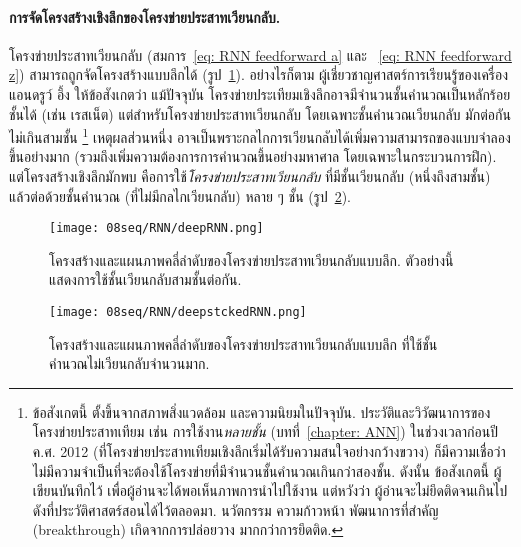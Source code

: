 \paragraph{การจัดโครงสร้างเชิงลึกของโครงข่ายประสาทเวียนกลับ.}
โครงข่ายประสาทเวียนกลับ (สมการ~\ref{eq: RNN feedforward a} และ ~\ref{eq: RNN feedforward z})
สามารถถูกจัดโครงสร้างแบบลึกได้ (รูป~\ref{fig: deep RNN}).
อย่างไรก็ตาม
ผู้เชี่ยวชาญศาสตร์การเรียนรู้ของเครื่อง
แอนดรูว์ อึ้ง\cite{Ng2020a} ให้ข้อสังเกตว่า
แม้ปัจจุบัน โครงข่ายประเทียมเชิงลึกอาจมีจำนวนชั้นคำนวณเป็นหลักร้อยชั้นได้ (เช่น เรสเน็ต\cite{He_2016_CVPR})
แต่สำหรับโครงข่ายประสาทเวียนกลับ โดยเฉพาะชั้นคำนวณเวียนกลับ มักต่อกันไม่เกินสามชั้น%
\footnote{%
	ข้อสังเกตนี้ ตั้งขึ้นจากสภาพสิ่งแวดล้อม และความนิยมในปัจจุบัน.
	ประวัติและวิวัฒนาการของโครงข่ายประสาทเทียม 
	เช่น การใช้งาน\textit{หลายชั้น} (บทที่~\ref{chapter: ANN})
	ในช่วงเวลาก่อนปี ค.ศ. 2012 (ที่โครงข่ายประสาทเทียมเชิงลึกเริ่มได้รับความสนใจอย่างกว้างขวาง)
	ก็มีความเชื่อว่า ไม่มีความจำเป็นที่จะต้องใช้โครงข่ายที่มีจำนวนชั้นคำนวณเกินกว่าสองชั้น.
	ดังนั้น ข้อสังเกตนี้ ผู้เขียนบันทึกไว้ เพื่อผู้อ่านจะได้พอเห็นภาพการนำไปใช้งาน 
	แต่หวังว่า ผู้อ่านจะไม่ยึดติดจนเกินไป
	ดังที่ประวัติศาสตร์สอนได้ไว้ตลอดมา.
	นวัตกรรม ความก้าวหน้า พัฒนาการที่สำคัญ (breakthrough) เกิดจากการปล่อยวาง มากกว่าการยึดติด.
}
เหตุผลส่วนหนึ่ง อาจเป็นพราะกลไกการเวียนกลับได้เพิ่มความสามารถของแบบจำลองขึ้นอย่างมาก
(รวมถึงเพิ่มความต้องการการคำนวณขึ้นอย่างมหาศาล โดยเฉพาะในกระบวนการฝึก).
แต่โครงสร้างเชิงลึกมักพบ คือการใช้\textit{โครงข่ายประสาทเวียนกลับ} ที่มีชั้นเวียนกลับ (หนึ่งถึงสามชั้น) แล้วต่อด้วยชั้นคำนวณ (ที่ไม่มีกลไกเวียนกลับ) หลาย ๆ ชั้น (รูป~\ref{fig: deep RNN with non-recurrent layers}).


\begin{figure}
	\begin{center}		
		\texttt{[image: 08seq/RNN/deepRNN.png]}	
		\caption[โครงข่ายประสาทเวียนกลับแบบลึก]{โครงสร้างและแผนภาพคลี่ลำดับของโครงข่ายประสาทเวียนกลับแบบลึก.
			ตัวอย่างนี้ แสดงการใช้ชั้นเวียนกลับสามชั้นต่อกัน.			
		}
		\label{fig: deep RNN}
	\end{center}
\end{figure}



\begin{figure}
	\begin{center}		
		\texttt{[image: 08seq/RNN/deepstckedRNN.png]}	
		\caption[โครงข่ายประสาทเวียนกลับแบบลึก ที่ใช้ชั้นคำนวณไม่เวียนกลับจำนวนมาก]{โครงสร้างและแผนภาพคลี่ลำดับของโครงข่ายประสาทเวียนกลับแบบลึก
			ที่ใช้ชั้นคำนวณไม่เวียนกลับจำนวนมาก.			
		}
		\label{fig: deep RNN with non-recurrent layers}
	\end{center}
\end{figure}

